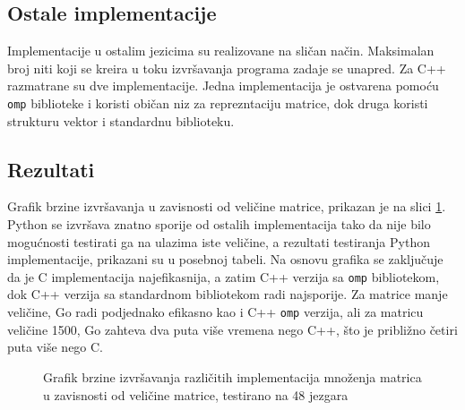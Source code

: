 \documentclass[12pt,oneside]{memoir}
\begin{document}
\subsection{Ostale implementacije}
Implementacije u ostalim jezicima su realizovane na sličan način. Maksimalan broj niti koji se kreira u toku izvršavanja programa zadaje se unapred. Za C++ razmatrane su dve implementacije. Jedna implementacija je ostvarena pomoću \texttt{omp} biblioteke i koristi običan niz za reprezntaciju matrice, dok druga koristi strukturu vektor i standardnu biblioteku.


\subsection{Rezultati}

Grafik brzine izvršavanja u zavisnosti od veličine matrice, prikazan je na slici \ref{fig:matrix1}. Python se izvršava znatno sporije od ostalih implementacija tako da nije bilo mogućnosti testirati ga na ulazima iste veličine, a rezultati testiranja Python implementacije, prikazani su u posebnoj tabeli. Na osnovu grafika se zaključuje da je C implementacija najefikasnija, a zatim C++ verzija sa \texttt{omp} bibliotekom, dok C++ verzija sa standardnom bibliotekom radi najsporije. Za matrice manje veličine, Go radi podjednako efikasno kao i C++ \texttt{omp} verzija, ali za matricu veličine 1500, Go zahteva dva puta više vremena nego C++, što je približno četiri puta više nego C. 

\begin{figure}
\begin{center}


\caption{Grafik brzine izvršavanja različitih implementacija množenja matrica u zavisnosti od veličine matrice, testirano na 48 jezgara}
\label{fig:matrix1}
\end{center}
\end{figure}
\end{document}
